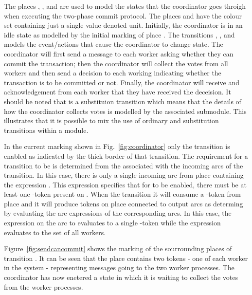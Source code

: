 The places , , and
 are used to model the states that the
coordinator goes throigh when executing the two-phase commit
protocol. The places  and  have the
colour set  containing just a single value \smlcode{()}
denoted unit. Initially, the coordinator is in an idle state as
modelled by the initial marking of place . The
transitions , , and
 models the event/actions that cause the
coordinator to change state. The coordinator will first send a message
to each worker asking whether they can commit the transaction; then
the coordinator will collect the votes from all workers and then send
a decision to each working indicating whether the transaction is to be
committed or not. Finally, the coordinator will receive and
acknowledgement from each worker that they have received the
deceision.  It should be noted that  is a
substituion transition which means that the details of how the
coordinator collects votes is modelled by the associated
 submodule. This illustrates that it is possible
to mix the use of ordinary and substitution transitions within a
module.


In the current marking shown in Fig.~\ref{fig:coordinator} only the
transition  is enabled as indicated by the
thick border of that transition. The requirement for a transition to
be  is determined from the 
associated with the incoming arcs of the transition. In this case,
there is only a single incoming arc from place 
containing the expression \smlcode{()}. This expression specifies that
for  to be enabled, there must be at least one
\smlcode{()}-token present on . When the
 transition  it will consume a
\smlcode{()}-token from place  and it will produce
tokens on place connected to output arcs as determing by evaluating
the arc expressions of the corresponding arcs. In this case, the
expression \smlcode{()} on the arc to  evaluates
to a single \smlcode{()}-token while the expression 
evaluates to the set of all workers. 

Figure~\ref{fig:sendcancommit} shows the marking of the sourrounding
places of transition . It can be seen that the
place  contains two tokens - one of each worker in
the system - representing messages going to the two worker
processes. The coordinator has now enetered a state in which it is
waiting to collect the votes from the worker processes.

